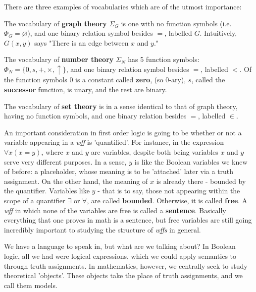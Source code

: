 There are three examples of vocabularies which are of the utmost importance:
\begin{example}
    The vocabulary of \textbf{graph theory} $\Sigma_G$ is one with no function symbols (i.e. $\Phi_G = \varnothing$), and one binary relation symbol besides $=$, labelled $G$. Intuitively, $G(x,y)$ says "There is an edge between $x$ and $y$."
\end{example}
\begin{example}
    The vocabulary of \textbf{number theory} $\Sigma_N$ has 5 function symbols: $\Phi_N = \{0,s,+,\times,\uparrow\}$, and one binary relation symbol besides $=$, labelled $<$. Of the function symbols $0$ is a constant called \textbf{zero}, (so $0$-ary), $s$, called the \textbf{successor} function, is unary, and the rest are binary.
\end{example}
\begin{example}
    The vocabulary of \textbf{set theory} is in a sense identical to that of graph theory, having no function symbols, and one binary relation besides $=$, labelled $\in$. 
\end{example}
An important consideration in first order logic is going to be whether or not a variable appearing in a \textit{wff} is 'quantified'. For instance, in the expression $\forall x (x=y)$, where $x$ and $y$ are variables, despite both being variables $x$ and $y$ serve very different purposes. In a sense, $y$ is like the Boolean variables we knew of before: a placeholder, whose meaning is to be 'attached' later via a truth assignment. On the other hand, the meaning of $x$ is already there - bounded by the quantifier. Variables like $y$ - that is to say, those not appearing within the scope of a quantifier $\exists$ or $\forall$, are called \textbf{bounded}. Otherwise, it is called \textbf{free}. A \textit{wff} in which none of the variables are free is called a \textbf{sentence}. Basically everything that one proves in math is a sentence, but free variables are still going incredibly important to studying the structure of \textit{wffs} in general. 
\par We have a language to speak in, but what are we talking about? In Boolean logic, all we had were logical expressions, which we could apply semantics to through truth assignments. In mathematics, however, we centrally seek to study theoretical 'objects'. These objects take the place of truth assignments, and we call them models.
